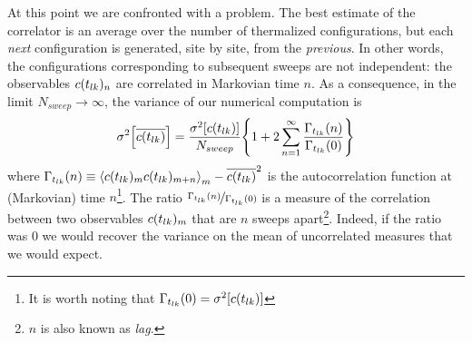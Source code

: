 At this point we are confronted with a problem. The best estimate of the correlator is an average over the number of thermalized
configurations, but each \textit{next} configuration is generated, site by site, from the \textit{previous}. In other words, the configurations corresponding to subsequent
sweeps are not independent: the observables $c(t_{lk})_{n}$ are correlated in Markovian time $n$.
As a consequence, in the limit $N_{sweep}\to\infty$, the variance of our numerical computation is
\begin{align}
\sigma ^2\qty[\overline{c(t_{lk})}] = \frac{\sigma ^2\qty[c(t_{lk})]}{N_{sweep}}\qty{1 + 2\sum_{n=1}^{\infty}\frac{\Gamma_{t_{lk}}(n)}{\Gamma_{t_{lk}}(0)}}
\end{align}
where $\Gamma_{\t}(n) \equiv \ev{\ct_{m} \ct_{m+n}}_{m}-\overline{\ct}^2$ is the autocorrelation function at (Markovian) time $n$\footnote{It is worth noting that $\Gamma_{t_{lk}}(0) = \sigma ^2[c(t_{lk})]$}.
The ratio $\nicefrac{\Gamma_{t_{lk}}(n)}{\Gamma_{t_{lk}}(0)}$ is a measure of the correlation between two observables $c(t_{lk})_{m}$ that are $n$ sweeps apart\footnote{$n$ is also known as \textit{lag}.}. Indeed, if the ratio was $0$ we would recover the variance on the mean of uncorrelated measures that we would expect.

